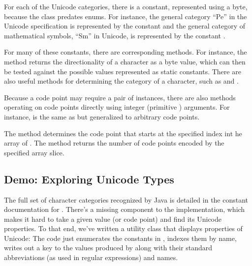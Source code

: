 For each of the Unicode categories, there is a constant, represented
using a byte, because the class predates enums.  For instance, the
general category ``Pe'' in the Unicode specification is represented by
the constant  and the general category of
mathematical symbols, ``Sm'' in Unicode, is represented by the
constant .

For many of these constants, there are corresponding methods.  For
instance, the method  returns the
directionality of a character as a byte value, which can then be tested
against the possible values represented as static constants.  There
are also useful methods for determining the category of a character,
such as  and .

Because a code point may require a pair of  instances,
there are also methods operating on code
points directly using integer (primitive ) arguments.  For
instance,  is the same as 
but generalized to arbitrary code points.  

The method  determines the code point
that starts at the specified index int he array of .  The
method  returns the number of
code points encoded by the specified  array slice.

\subsection{Demo: Exploring Unicode Types}\label{section:char-unicode-types}

The full set of character categories recognized by Java is detailed in
the constant documentation for .  There's a
missing component to the implementation, which makes it hard to take a
given  value (or code point) and find its Unicode
properties.  To that end, we've written a utility class
 that displays properties of Unicode:
%
%
The code just enumerates the constants in , indexes them
by name, writes out a key to the values produced by
 along with their standard abbreviations
(as used in regular expressions) and names.

